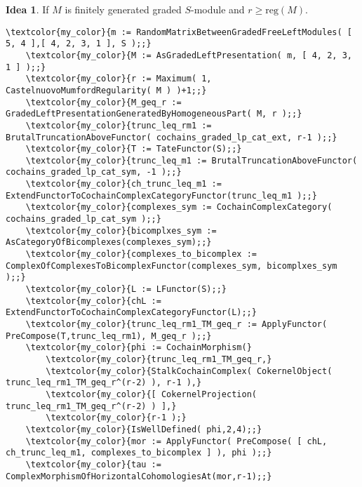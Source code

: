 \documentclass[16pt,a4paper]{extarticle}
\theoremstyle{definition}
\newtheorem{idea}{Idea}
\theoremstyle{theorem}
\begin{document}
    
    \begin{idea}
        If $M$ is finitely generated graded $S$-module and $r\geq\mathrm{reg}(M)$.
    \end{idea}
    \begin{Verbatim}[commandchars=\\\{\}, fontseries=b, frame=single, label=Gap Code, framerule=0.5mm, rulecolor=\color{rule_color} ]
    \textcolor{my_color}{m := RandomMatrixBetweenGradedFreeLeftModules( [ 5, 4 ],[ 4, 2, 3, 1 ], S );;}
    \textcolor{my_color}{M := AsGradedLeftPresentation( m, [ 4, 2, 3, 1 ] );;}
    \textcolor{my_color}{r := Maximum( 1, CastelnuovoMumfordRegularity( M ) )+1;;}
    \textcolor{my_color}{M_geq_r := GradedLeftPresentationGeneratedByHomogeneousPart( M, r );;}
    \textcolor{my_color}{trunc_leq_rm1 := BrutalTruncationAboveFunctor( cochains_graded_lp_cat_ext, r-1 );;}
    \textcolor{my_color}{T := TateFunctor(S);;}
    \textcolor{my_color}{trunc_leq_m1 := BrutalTruncationAboveFunctor( cochains_graded_lp_cat_sym, -1 );;}
    \textcolor{my_color}{ch_trunc_leq_m1 := ExtendFunctorToCochainComplexCategoryFunctor(trunc_leq_m1 );;}
    \textcolor{my_color}{complexes_sym := CochainComplexCategory( cochains_graded_lp_cat_sym );;}
    \textcolor{my_color}{bicomplxes_sym := AsCategoryOfBicomplexes(complexes_sym);;}
    \textcolor{my_color}{complexes_to_bicomplex := ComplexOfComplexesToBicomplexFunctor(complexes_sym, bicomplxes_sym );;}
    \textcolor{my_color}{L := LFunctor(S);;}
    \textcolor{my_color}{chL := ExtendFunctorToCochainComplexCategoryFunctor(L);;}
    \textcolor{my_color}{trunc_leq_rm1_TM_geq_r := ApplyFunctor( PreCompose(T,trunc_leq_rm1), M_geq_r );;}
    \textcolor{my_color}{phi := CochainMorphism(}
        \textcolor{my_color}{trunc_leq_rm1_TM_geq_r,}
        \textcolor{my_color}{StalkCochainComplex( CokernelObject( trunc_leq_rm1_TM_geq_r^(r-2) ), r-1 ),}
        \textcolor{my_color}{[ CokernelProjection( trunc_leq_rm1_TM_geq_r^(r-2) ) ],}
        \textcolor{my_color}{r-1 );}
    \textcolor{my_color}{IsWellDefined( phi,2,4);;}
    \textcolor{my_color}{mor := ApplyFunctor( PreCompose( [ chL, ch_trunc_leq_m1, complexes_to_bicomplex ] ), phi );;}
    \textcolor{my_color}{tau := ComplexMorphismOfHorizontalCohomologiesAt(mor,r-1);;}
    \end{Verbatim}
\end{document}
